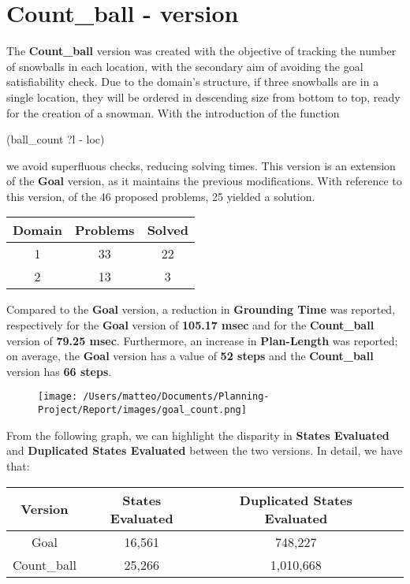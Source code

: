 \documentclass{article}
\begin{document}
\section*{Count\_ball - version}
The \textbf{Count\_ball} version was created with the objective of tracking the number of snowballs in each location, with the secondary aim of avoiding the goal satisfiability check.
Due to the domain's structure, if three snowballs are in a single location, they will be ordered in descending size from bottom to top, ready for the creation of a snowman.
With the introduction of the function 
\begin{center}
    (ball\_count ?l - loc)
\end{center}
we avoid superfluous checks, reducing solving times.
This version is an extension of the \textbf{Goal} version, as it maintains the previous modifications.
With reference to this version, of the 46 proposed problems, 25 yielded a solution.
\begin{table}[H]
    \centering
    \begin{tabular}{|c|c|c|}
        \hline
        \textbf{Domain} & \textbf{Problems} & \textbf{Solved}\\
        \hline
        1 & 33 & 22 \\
        \hline
        2 & 13 & 3\\
        \hline
    \end{tabular}
\end{table}
\noindent
Compared to the \textbf{Goal} version, 
a reduction in \textbf{Grounding Time} was reported, respectively for the \textbf{Goal} version of \textbf{105.17 msec} and for the \textbf{Count\_ball} version of \textbf{79.25 msec}.
Furthermore, an increase in \textbf{Plan-Length} was reported; on average, the \textbf{Goal} version has a value of \textbf{52 steps} and the \textbf{Count\_ball} version has \textbf{66 steps}.
\begin{figure}[H]
    \centering
    \texttt{[image: /Users/matteo/Documents/Planning-Project/Report/images/goal\_count.png]}
    \label{fig:count_ball}
\end{figure}
\noindent
From the following graph, we can highlight the disparity in \textbf{States Evaluated} and \textbf{Duplicated States Evaluated} between the two versions.
In detail, we have that:
\begin{table}[H]
    \centering
    \begin{tabular}{|c|c|c|c|}
        \hline
        \textbf{Version} & \textbf{States Evaluated} & \textbf{Duplicated States Evaluated} \\
        \hline
        Goal & 16,561 & 748,227 \\
        \hline
        Count\_ball & 25,266 & 1,010,668 \\
        \hline
    \end{tabular}
\end{table}
\end{document}

